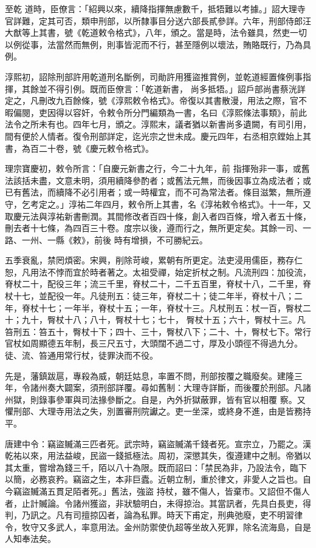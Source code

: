 \begin{pinyinscope}
 至乾
 道時，臣僚言：「紹興以來，續降指揮無慮數千，抵牾難以考據。」詔大理寺官詳難，定其可否，類申刑部，以所隸事目分送六部長貳參詳。六年，刑部侍郎汪大猷等上其書，號《乾道敕令格式》，八年，頒之。當是時，法令雖具，然吏一切以例從事，法當然而無例，則事皆泥而不行，甚至隱例以壞法，賄賂既行，乃為具例。



 淳熙初，詔除刑部許用乾道刑名斷例，司勛許用獲盜推賞例，並乾道經置條例事指揮，其餘並不得引例。既而臣僚言：「乾道新書，
 尚多抵牾。」詔戶部尚書蔡洸詳定之，凡刪改九百餘條，號《淳熙敕令格式》。帝復以其書散漫，用法之際，官不暇偏閱，吏因得以容奸，令敕令所分門編類為一書，名曰《淳熙條法事類》，前此法令之所未有也。四年七月，頒之。淳熙末，議者猶以新書尚多遺闕，有司引用，間有便於人情者。復令刑部詳定，迄光宗之世未成。慶元四年，右丞相京鏜始上其書，為百二十卷，號《慶元敕令格式》。



 理宗寶慶初，敕令所言：「自慶元新書之行，今二十九年，前
 指揮殆非一事，或舊法該括未盡，文意未明，須用續降參酌者；或舊法元無，而後因事立為成法者；或已有舊法，而續降不必引用者；或一時權宜，而不可為常法者。條目滋繁，無所遵守，乞考定之。」淳祐二年四月，敕令所上其書，名《淳祐敕令格式》。十一年，又取慶元法與淳祐新書刪潤。其間修改者百四十條，創入者四百條，增入者五十條，刪去者十七條，為四百三十卷。度宗以後，遵而行之，無所更定矣。其餘一司、一路、一州、一縣《敕》，前後
 時有增損，不可勝紀云。



 五季衰亂，禁罔煩密。宋興，削除苛峻，累朝有所更定。法吏浸用儒臣，務存仁恕，凡用法不悖而宜於時者著之。太祖受禪，始定折杖之制。凡流刑四：加役流，脊杖二十，配役三年；流三千里，脊杖二十，二千五百里，脊杖十八，二千里，脊杖十七，並配役一年。凡徒刑五：徒三年，脊杖二十；徒二年半，脊杖十八；二年，脊杖十七；一年半，脊杖十五；一年，脊杖十三。凡杖刑五：杖一百，臀杖二十；九十，臀杖十八；八十，臀杖十七；七十，
 臀杖十五；六十，臀杖十三。凡笞刑五：笞五十，臀杖十下；四十、三十，臀杖八下；二十、十，臀杖七下。常行官杖如周顯德五年制，長三尺五寸，大頭闊不過二寸，厚及小頭徑不得過九分。徒、流、笞通用常行杖，徒罪決而不役。



 先是，藩鎮跋扈，專殺為威，朝廷姑息，率置不問，刑部按覆之職廢矣。建隆三年，令諸州奏大闢案，須刑部詳覆。尋如舊制：大理寺詳斷，而後覆於刑部。凡諸州獄，則錄事參軍與司法掾參斷之。自是，內外折獄蔽罪，皆有官以相覆
 察。又懼刑部、大理寺用法之失，別置審刑院讞之。吏一坐深，或終身不進，由是皆務持平。



 唐建中令：竊盜贓滿三匹者死。武宗時，竊盜贓滿千錢者死。宣宗立，乃罷之。漢乾祐以來，用法益峻，民盜一錢抵極法。周初，深懲其失，復遵建中之制。帝猶以其太重，嘗增為錢三千，陌以八十為限。既而詔曰：「禁民為非，乃設法令，臨下以簡，必務哀矜。竊盜之生，本非巨蠹。近朝立制，重於律文，非愛人之旨也。自今竊盜贓滿五貫足陌者死。」舊法，強盜
 持杖，雖不傷人，皆棄市。又詔但不傷人者，止計贓論。令諸州獲盜，非狀驗明白，未得掠治。其當訊者，先具白長吏，得判，乃訊之。凡有司擅掠囚者，論為私罪。時天下甫定，刑典弛廢，吏不明習律令，牧守又多武人，率意用法。金州防禦使仇超等坐故入死罪，除名流海島，自是人知奉法矣。




\end{pinyinscope}
